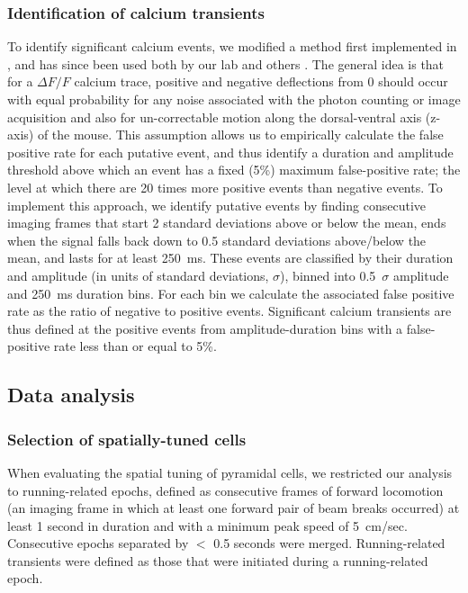 \subsubsection{Identification of calcium transients}\label{sec:df:methods:transients}
To identify significant calcium events, we modified a method first implemented in \citealt{Dombeck2007}, and has since been used both by our lab \citep{Danielson2016a, Danielson2016b, Lovett-Barron2014} and others \citep{Dombeck2010, Rajasethupathy2015}. The general idea is that for a $\Delta F/F$ calcium trace, positive and negative deflections from 0 should occur with equal probability for any noise associated with the photon counting or image acquisition and also for un-correctable motion along the dorsal-ventral axis (z-axis) of the mouse. This assumption allows us to empirically calculate the false positive rate for each putative event, and thus identify a duration and amplitude threshold above which an event has a fixed (5\%) maximum false-positive rate; the level at which there are 20 times more positive events than negative events. To implement this approach, we identify putative events by finding consecutive imaging frames that start 2 standard deviations above or below the mean, ends when the signal falls back down to 0.5 standard deviations above/below the mean, and lasts for at least 250~ms. These events are classified by their duration and amplitude (in units of standard deviations, $\sigma$), binned into 0.5~$\sigma$ amplitude and 250~ms duration bins. For each bin we calculate the associated false positive rate as the ratio of negative to positive events. Significant calcium transients are thus defined at the positive events from amplitude-duration bins with a false-positive rate less than or equal to 5\%.

\subsection{Data analysis}
\subsubsection{Selection of spatially-tuned cells}\label{sec:df:methods:pc_identification}
When evaluating the spatial tuning of pyramidal cells, we restricted our analysis to running-related epochs, defined as consecutive frames of forward locomotion (an imaging frame in which at least one forward pair of beam breaks occurred) at least 1 second in duration and with a minimum peak speed of 5~cm/sec. Consecutive epochs separated by $<$ 0.5 seconds were merged. Running-related transients were defined as those that were initiated during a running-related epoch.

